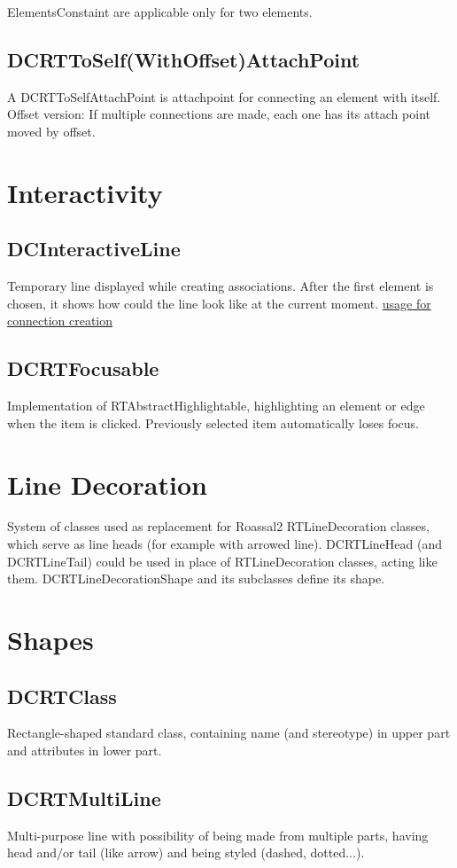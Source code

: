 \documentclass[a4paper,10pt,twoside]{book}
\begin{document}
ElementsConstaint are applicable only for two elements.
\subsection{ DCRTToSelf(WithOffset)AttachPoint}
A DCRTToSelfAttachPoint is attachpoint for connecting an element with itself.
Offset version: If multiple connections are made, each one has its attach point moved by offset.
\section{ Interactivity}\subsection{ DCInteractiveLine}
Temporary line displayed while creating associations. After the first element is chosen, it shows how could the line look like at the current moment.
\href{../figures/connection%20creation%20tool%20sequence.png}{usage for connection creation}
\subsection{ DCRTFocusable}
Implementation of RTAbstractHighlightable, highlighting an element or edge when the item is clicked. Previously selected item automatically loses focus.
\section{ Line Decoration}
System of classes used as replacement for Roassal2 RTLineDecoration classes, which serve as line heads (for example with arrowed line).
DCRTLineHead (and DCRTLineTail) could be used in place of RTLineDecoration classes, acting like them.
DCRTLineDecorationShape and its subclasses define its shape.
\section{ Shapes}\subsection{ DCRTClass}
Rectangle-shaped standard class, containing name (and stereotype) in upper part and attributes in lower part.
\subsection{ DCRTMultiLine}
Multi-purpose line with possibility of being made from multiple parts, having head and$/$or tail (like arrow) and being styled (dashed, dotted...).



\ifx\wholebook\relax\else
   
\end{document}

